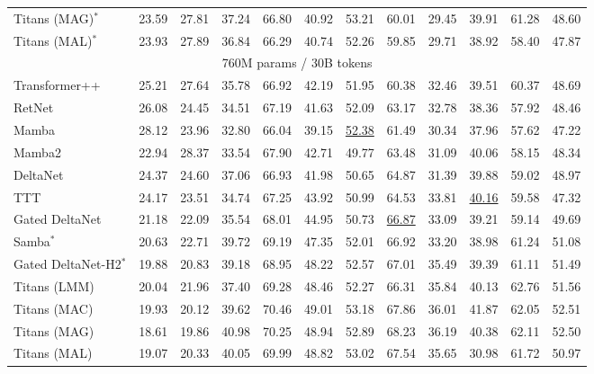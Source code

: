 \documentclass{article}
\begin{document}
\begin{table}[t!]
{\begin{tabular}{l|c c|c c c c c c c c c}
Titans (MAG)$^*$         & \cellcolor{mygreen}23.59 & 27.81  & \cellcolor{mygreen}37.24 & \cellcolor{mygreen}66.80 & 40.92 &  \cellcolor{mygreen}53.21 & 60.01 & 29.45 & 39.91 & 61.28 & 48.60 \\
Titans (MAL)$^*$         & 23.93 & 27.89  & 36.84 & 66.29 & 40.74 & 52.26 &  59.85 & \cellcolor{mygreen}29.71 & 38.92 & 58.40 & 47.87 \\
\midrule
\multicolumn{12}{c}{760M params / 30B tokens} \\
\midrule
 Transformer++ & 25.21 & 27.64 & 35.78 & 66.92 & 42.19 &	51.95 & 60.38	& 32.46 &  39.51  & 60.37  & 48.69 \\
 RetNet & 26.08 & 24.45 & 34.51 & 67.19 & 41.63 &	52.09 & 63.17	& 32.78 &  38.36  & 57.92  &  48.46\\
 Mamba & 28.12 & 23.96 & 32.80 & 66.04 & 39.15 &	\cellcolor{myblue}\underline{52.38} & 61.49	& 30.34 &  37.96  & 57.62  & 47.22 \\
 Mamba2 & 22.94 & 28.37 & 33.54 & 67.90 & 42.71 &	49.77 & {63.48}	& 31.09 &  40.06  & 58.15  & 48.34 \\
 DeltaNet & 24.37 & 24.60 & 37.06 & 66.93 & 41.98 &	50.65 & 64.87	& 31.39 &  39.88  & 59.02  & 48.97 \\
 TTT & 24.17 & 23.51 & 34.74 & 67.25 & 43.92 & 50.99 & 64.53 & 33.81 & \cellcolor{myblue}\underline{40.16} & 59.58 & 47.32 \\
 Gated DeltaNet & {21.18} & {22.09} & {35.54} & {68.01} & {44.95} & {50.73} & \cellcolor{myblue}\underline{66.87}	& {33.09} &  {39.21}  & 59.14  & 49.69 \\
 Samba$^{*}$ & 20.63 & 22.71 & 39.72 & 69.19 & 47.35 &	52.01 & 66.92	& 33.20 &  38.98  & 61.24  & 51.08 \\
  Gated DeltaNet-H2$^*$ & {19.88} & 20.83 & {39.18} & 68.95 & {48.22} &	{52.57} & 67.01	& {35.49} &  {39.39}  & 61.11  & 51.49 \\
  \midrule
Titans (LMM) & \cellcolor{myblue}20.04 & \cellcolor{myblue}21.96 &  \cellcolor{myblue}37.40 & \cellcolor{myblue}69.28  & \cellcolor{myblue}48.46 & 52.27 & 66.31 & \cellcolor{myblue}35.84 & 40.13 & \cellcolor{myblue}62.76 & \cellcolor{myblue}51.56\\
Titans (MAC) & 19.93 & 20.12 &  39.62 & \cellcolor{mygreen}70.46  & \cellcolor{mygreen}49.01 & \cellcolor{mygreen}53.18 & 67.86 & 36.01 & \cellcolor{mygreen}41.87 & \cellcolor{mygreen}62.05 & \cellcolor{mygreen}52.51\\
Titans (MAG) & \cellcolor{mygreen}18.61 & \cellcolor{mygreen}19.86 &  \cellcolor{mygreen}40.98 & 70.25  & 48.94 & 52.89 & \cellcolor{mygreen}68.23 & \cellcolor{mygreen}36.19 & 40.38 & 62.11 & 52.50\\
Titans (MAL) & 19.07 & 20.33 &  40.05 & 69.99  & 48.82 & 53.02& 67.54 & 35.65 & 30.98 & 61.72 & 50.97\\
\bottomrule
\end{tabular}
}
\end{table}
\end{document}
